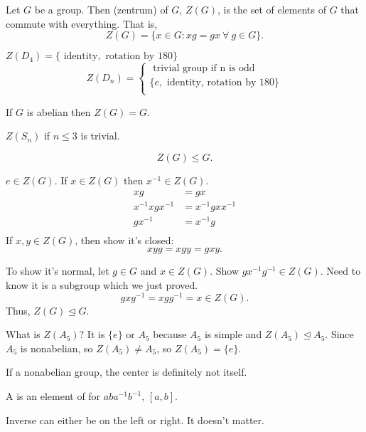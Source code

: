 \documentclass[class=article,crop=false]{standalone}
\begin{document}
\begin{defn}[center]
	Let $ G$ be a group. Then   (zentrum) of $ G$,  $ Z(G)$, is the set of elements of $ G$ that commute with everything. That is,
	\[
		Z(G) = \{x \in G: xg=gx \ \forall \ g \in G\} 
	.\] 
\end{defn}
\begin{eg}[]
	$ Z(D_4) = \{ \text{ identity}, \text{ rotation by 180}\} $ 
	\begin{equation*}
		Z(D_n)=
	\begin{cases}
		\text{ trivial group if n is odd}\\
		\{e, \text{ identity, rotation by 180} \} \\ 
	\end{cases}
	\end{equation*}
\end{eg}
\begin{note}[]
	If $ G$ is abelian then  $ Z(G)=G$.
\end{note}
\begin{note}[]
	$ Z(S_n)$ if $ n\leq 3$ is trivial.
\end{note}
\begin{thm}[]
 \[
	 Z(G) \leq G
.\] 
\end{thm}
\begin{prf}
	$ e \in Z(G)$. If $ x \in Z(G)$ then $ x^{-1} \in Z(G)$.
	\begin{align*}
		xg&= gx \\
		x^{-1}xgx^{-1}&=x^{-1}gx x^{-1}\\
		gx^{-1}&= x^{-1}g \\
	\end{align*}
	If $ x,y \in Z(G)$, then show it's closed:
	\[
	xyg=xgy=gxy
	.\] 

	To show it's normal, let $ g \in G$ and $ x \in Z(G)$. Show $ gx^{-1}g^{-1} \in Z(G)$. Need to know it is a subgroup which we just proved. 
	\[
		gxg^{-1}= xg g^{-1}= x \in Z(G)
	.\] 
	Thus, $ Z(G) \trianglelefteq G$.
\end{prf}
\begin{eg}[]
	What is $ Z(A_5)$? It is $ \{e\} $ or $ A_5$ because $ A_5$ is simple and $ Z(A_5) \trianglelefteq A_5$. Since $ A_5$ is nonabelian, so $ Z(A_5) \neq A_5$, so $ Z(A_5) = \{e\} $.
\end{eg}
\begin{note}[]
If a nonabelian group, the center is definitely not itself.
\end{note}

\begin{defn}[commutator]
	A  is an element of for $ aba^{-1}b^{-1}$, $ [a,b]$. 
\end{defn}
\begin{note}[]
Inverse can either be on the left or right. It doesn't matter.
\end{note}
\end{document}
